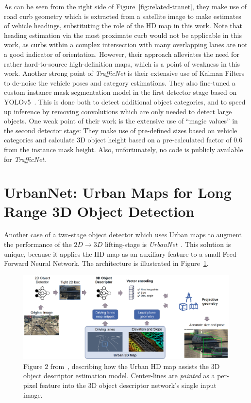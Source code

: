 As can be seen from the right side of Figure~\ref{fig:related-tranet}, they make use of road curb geometry which is extracted from a satellite image to make estimates of vehicle headings, substituting the role of the HD map in this work.
Note that heading estimation via the most proximate curb would not be applicable in this work, as curbs within a complex intersection with many overlapping lanes are not a good indicator of orientation.
However, their approach alleviates the need for rather hard-to-source high-definition maps, which is a point of weakness in this work.
Another strong point of \textit{TrafficNet} is their extensive use of Kalman Filters~\cite{welch1995kalman} to de-noise the vehicle poses and category estimations.
They also fine-tuned a custom instance mask segmentation model in the first detector stage based on YOLOv5~\cite{glenn_jocher_2020_4154370}.
This is done both to detect additional object categories, and to speed up inference by removing convolutions which are only needed to detect large objects.
One weak point of their work is the extensive use of \enquote{magic values} in the second detector stage: They make use of pre-defined sizes based on vehicle categories and calculate 3D object height based on a pre-calculated factor of \textit{$0.6$} from the instance mask height.
Also, unfortunately, no code is publicly available for \textit{TrafficNet}.

\section{UrbanNet: Urban Maps for Long Range 3D Object Detection}
\label{sec:related-urbnet}

Another case of a two-stage object detector which uses Urban maps to augment the performance of the $2D \rightarrow 3D$ lifting-stage is \textit{UrbanNet}~\cite{carrillo2021urbannet}.
This solution is unique, because it applies the HD map as an auxiliary feature to a small Feed-Forward Neural Network.
The architecture is illustrated in Figure~\ref{fig:related-urbnet}.

\begin{figure}[htb]
    \centering
    \includegraphics[width=1.0\linewidth]{figures/urbannet_architecture}
    \caption{Figure 2 from~\cite{carrillo2021urbannet}, describing how the Urban HD map assists the 3D object descriptor estimation model. Center-lines are \textit{painted} as a per-pixel feature into the 3D object descriptor network's single input image.}
    \label{fig:related-urbnet}
\end{figure}

